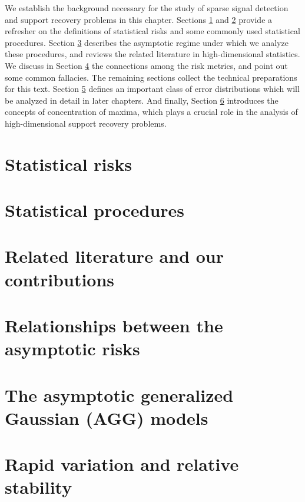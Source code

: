 
We establish the background necessary for the study of sparse signal detection and support recovery problems in this chapter.
Sections \ref{sec:risks} and \ref{sec:statistical-procedures} provide a refresher on the definitions of statistical risks and some commonly used statistical procedures.
Section \ref{sec:asymptotics} describes the asymptotic regime under which we analyze these procedures, and reviews the related literature in high-dimensional statistics.
We discuss in Section \ref{sec:risks-relations} the connections among the risk metrics, and point out some common fallacies.
The remaining sections collect the technical preparations for this text.
Section \ref{suppsec:AGG} defines an important class of error distributions which will be analyzed in detail in later chapters. 
And finally, Section \ref{subsec:RS} introduces the concepts of concentration of maxima, which plays a crucial role in the analysis of high-dimensional support recovery problems.


\section{Statistical risks}
\label{sec:risks}


\section{Statistical procedures}
\label{sec:statistical-procedures}


\section{Related literature and our contributions}
\label{sec:asymptotics}


\section{Relationships between the asymptotic risks}
\label{sec:risks-relations}


\section{The asymptotic generalized Gaussian (AGG) models}
\label{suppsec:AGG}


\section{Rapid variation and relative stability}
\label{subsec:RS}


